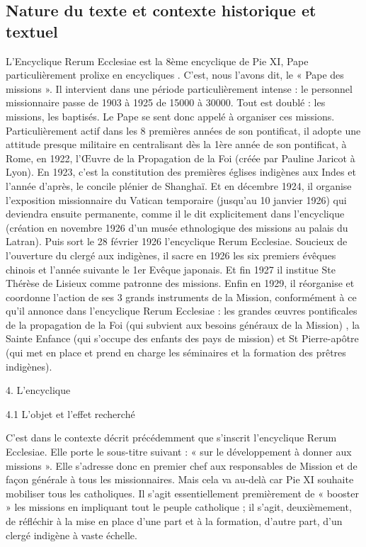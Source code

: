 \subsection{Nature du texte et contexte historique et textuel}
 

L’Encyclique Rerum Ecclesiae est la 8ème encyclique de Pie XI, Pape particulièrement prolixe en encycliques  . C’est, nous l’avons dit, le « Pape des missions ». Il intervient dans une période particulièrement intense :  le personnel missionnaire passe de 1903 à 1925 de 15000 à 30000. Tout est doublé : les missions, les baptisés. Le Pape se sent donc appelé à organiser ces missions. Particulièrement actif dans les 8 premières années de son pontificat, il adopte une attitude presque militaire en centralisant dès la 1ère année de son pontificat, à Rome, en 1922, l'Œuvre de la Propagation de la Foi (créée par Pauline Jaricot à Lyon). En 1923, c’est la constitution des premières églises indigènes aux Indes et l’année d’après, le concile plénier de Shanghaï. Et en décembre 1924, il organise l’exposition missionnaire du Vatican temporaire (jusqu’au 10 janvier 1926) qui deviendra ensuite permanente, comme il le dit explicitement dans l’encyclique (création en novembre 1926 d’un musée ethnologique des missions au palais du Latran). Puis sort le 28 février 1926 l’encyclique Rerum Ecclesiae. Soucieux de l'ouverture du clergé aux indigènes, il sacre en 1926 les six premiers évêques chinois et l’année suivante le 1er Evêque japonais. Et fin 1927 il institue Ste Thérèse de Lisieux comme patronne des missions. Enfin en 1929, il réorganise et coordonne l’action de ses 3 grands instruments de la Mission, conformément à ce qu’il annonce dans l’encyclique Rerum Ecclesiae : les grandes œuvres pontificales de la propagation de la Foi (qui subvient aux besoins généraux de la Mission) ,  la Sainte Enfance (qui s’occupe des enfants des pays de mission) et St Pierre-apôtre (qui met en place et prend en charge les séminaires et la formation des prêtres indigènes). 

4.	L’encyclique

	4.1 L’objet et l’effet recherché

C’est dans le contexte décrit précédemment que s’inscrit l’encyclique Rerum Ecclesiae. Elle porte le sous-titre suivant : « sur le développement à donner aux missions ». Elle s’adresse donc en premier chef aux responsables de Mission et de façon générale à tous les missionnaires. Mais cela va au-delà car Pie XI souhaite mobiliser tous les catholiques.
Il s’agit essentiellement premièrement de « booster » les missions en impliquant tout le peuple catholique ; il s’agit, deuxièmement, de réfléchir à la mise en place d’une part et à la formation, d’autre part, d’un clergé indigène à vaste échelle.

